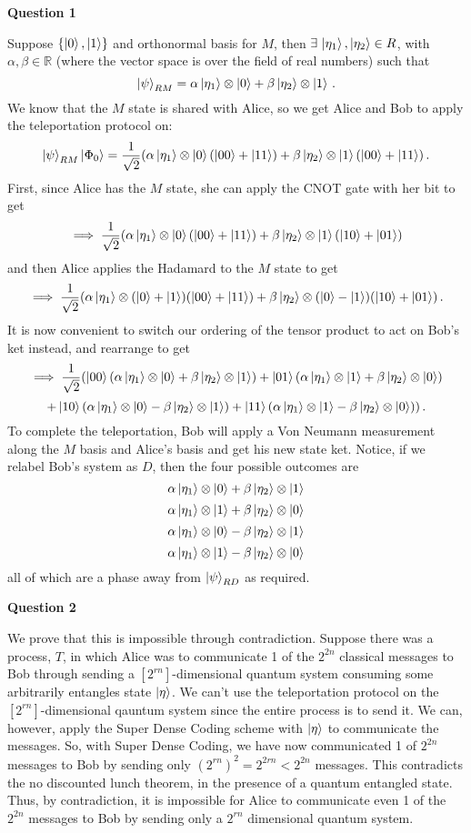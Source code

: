 \documentclass[10pt]{article}
\newcommand{\R}{\mathbb{R}}
\begin{document}
\textbf{Question 1}

Suppose $\{\ket{0},\ket{1}\}$ and orthonormal basis for $M$, then $\exists\, \ket{\eta_{1}},\ket{\eta_{2}}\in R$, with $\alpha,\beta \in \R$ (where the vector space is over the field of real numbers) such that
\[ \ket{\psi}_{RM} = \alpha\ket{\eta_{1}}\otimes \ket{0} + \beta\ket{\eta_{2}}\otimes \ket{1} \, .\]
We know that the $M$ state is shared with Alice, so we get Alice and Bob to apply the teleportation protocol on:
\[ \ket{\psi}_{RM}\ket{\Phi_{0}} = \frac{1}{\sqrt{2}}(\alpha\ket{\eta_{1}}\otimes \ket{0}(\ket{00} + \ket{11}) + \beta\ket{\eta_{2}}\otimes \ket{1}(\ket{00} + \ket{11}) \, .\]
First, since Alice has the $M$ state, she can apply the CNOT gate with her bit to get
\[ \implies \frac{1}{\sqrt{2}}(\alpha\ket{\eta_{1}}\otimes \ket{0}(\ket{00} + \ket{11}) + \beta\ket{\eta_{2}}\otimes \ket{1}(\ket{10} + \ket{01}) \]
and then Alice applies the Hadamard to the $M$ state to get
\[ \implies \frac{1}{\sqrt{2}}(\alpha\ket{\eta_{1}}\otimes (\ket{0} + \ket{1})(\ket{00} + \ket{11}) + \beta\ket{\eta_{2}}\otimes (\ket{0} - \ket{1})(\ket{10} + \ket{01}) \, .\]
It is now convenient to switch our ordering of the tensor product to act on Bob's ket instead, and rearrange to get
\[ \implies \frac{1}{\sqrt{2}}(\ket{00}(\alpha\ket{\eta_{1}}\otimes \ket{0} + \beta\ket{\eta_{2}}\otimes \ket{1}) + \ket{01}(\alpha\ket{\eta_{1}}\otimes \ket{1} + \beta\ket{\eta_{2}}\otimes \ket{0}) \]
\[ + \ket{10}(\alpha\ket{\eta_{1}}\otimes \ket{0} - \beta\ket{\eta_{2}}\otimes \ket{1}) + \ket{11}(\alpha\ket{\eta_{1}}\otimes\ket{1} - \beta\ket{\eta_{2}}\otimes \ket{0})) \, .\]
To complete the teleportation, Bob will apply a Von Neumann measurement along the $M$ basis and Alice's basis and get his new state ket. Notice, if we relabel Bob's system as $D$, then the four possible outcomes are
\[ \alpha\ket{\eta_{1}}\otimes \ket{0} + \beta\ket{\eta_{2}}\otimes \ket{1} \]
\[ \alpha\ket{\eta_{1}}\otimes \ket{1} + \beta\ket{\eta_{2}}\otimes \ket{0} \]
\[ \alpha\ket{\eta_{1}}\otimes \ket{0} - \beta\ket{\eta_{2}}\otimes \ket{1} \]
\[ \alpha\ket{\eta_{1}}\otimes \ket{1} - \beta\ket{\eta_{2}}\otimes \ket{0} \]
all of which are a phase away from $\ket{\psi}_{RD}$ as required.

\newpage
\textbf{Question 2}

We prove that this is impossible through contradiction. Suppose there was a process, $T$, in which Alice was to communicate 1 of the $2^{2n}$ classical messages to Bob through sending a $[2^{rn}]$-dimensional quantum system consuming some arbitrarily entangles state $\ket{\eta}$. We can't use the teleportation protocol on the $[2^{rn}]$-dimensional qauntum system since the entire process is to send it. We can, however, apply the Super Dense Coding scheme with $\ket{\eta}$ to communicate the messages. So, with Super Dense Coding, we have now communicated 1 of $2^{2n}$ messages to Bob by sending only $(2^{rn})^{2} = 2^{2rn} < 2^{2n}$ messages. This contradicts the no discounted lunch theorem, in the presence of a quantum entangled state. Thus, by contradiction, it is impossible for Alice to communicate even 1 of the $2^{2n}$ messages to Bob by sending only a $2^{rn}$ dimensional quantum system. 
\end{document}
